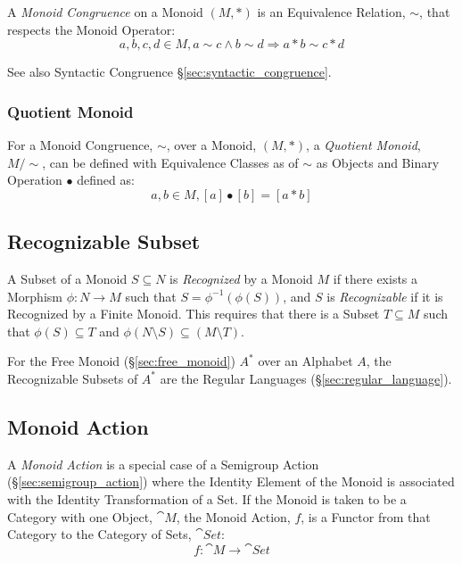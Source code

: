A \emph{Monoid Congruence} on a Monoid $(M,*)$ is an Equivalence
Relation, $\sim$, that respects the Monoid Operator:
\[
  a,b,c,d \in M, a \sim c \wedge b \sim d \Rightarrow a*b \sim c*d
\]

See also Syntactic Congruence \S\ref{sec:syntactic_congruence}.



\subsubsection{Quotient Monoid}\label{sec:quotient_monoid}

For a Monoid Congruence, $\sim$, over a Monoid, $(M,*)$, a
\emph{Quotient Monoid}, $M/\sim$, can be defined with Equivalence
Classes as of $\sim$ as Objects and Binary Operation $\bullet$ defined
as:
\[
  a,b \in M, [a]\bullet[b] = [a*b]
\]



\subsection{Recognizable Subset}\label{sec:recognizable}

A Subset of a Monoid $S \subseteq N$ is \emph{Recognized} by a Monoid $M$ if
there exists a Morphism $\phi : N \rightarrow M$ such that $S =
\phi^{-1}(\phi(S))$, and $S$ is \emph{Recognizable} if it is Recognized by a
Finite Monoid. This requires that there is a Subset $T \subseteq M$ such that
$\phi(S) \subseteq T$ and $\phi(N \setminus S) \subseteq (M \setminus T)$.

For the Free Monoid (\S\ref{sec:free_monoid}) $A^*$ over an Alphabet
$A$, the Recognizable Subsets of $A^*$ are the Regular Languages
(\S\ref{sec:regular_language}).



\subsection{Monoid Action}\label{sec:monoid_action}

A \emph{Monoid Action} is a special case of a Semigroup Action
(\S\ref{sec:semigroup_action}) where the Identity Element of the
Monoid is associated with the Identity Transformation of a Set. If the
Monoid is taken to be a Category with one Object, $\cat{M}$, the
Monoid Action, $f$, is a Functor from that Category to the Category of
Sets, $\cat{Set}$:
\[
  f : \cat{M} \rightarrow \cat{Set}
\]

